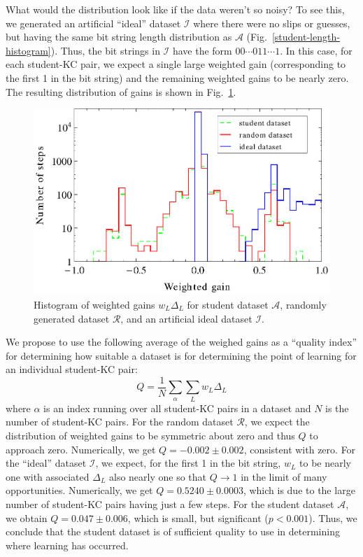 \documentclass{acmlarge-edm}
\begin{document}
What would the distribution look like if the data weren't 
so noisy?  To see this, we generated an artificial ``ideal'' dataset
$\mathcal{I}$ where there were no slips or guesses, but having
the same bit string length distribution as $\mathcal{A}$ 
(Fig.~\ref{student-length-histogram}).  Thus, the bit strings
in $\mathcal{I}$ have the form $00\cdots011\cdots1$.
In this case, for each student-KC pair, we expect a single 
large weighted gain (corresponding to the first 1 in the bit string) 
and the remaining weighted gains to be nearly zero.  The resulting 
distribution of gains is shown
in  Fig.~\ref{weighted-gain-histogram2}.

\begin{figure}
  \centering \includegraphics{weighted-gain-histogram2.eps}
   \caption{Histogram of weighted gains $w_L \Delta_L$ for
     student dataset $\mathcal{A}$, randomly generated dataset $\mathcal{R}$,
     and an artificial ideal dataset $\mathcal{I}$.}
    \label{weighted-gain-histogram2}
\end{figure}


We propose to use the following average of the weighed gains as
a ``quality index'' for determining how suitable a 
dataset is for determining the point of learning for an individual
student-KC pair:
%
\begin{equation}
           Q= \frac{1}{N} \sum_\alpha \sum_L w_L \Delta_L
\end{equation}
%
where $\alpha$ is an index running over all student-KC pairs in a 
dataset and $N$ is the number of student-KC pairs.
For the random dataset $\mathcal{R}$, we expect the distribution of 
weighted gains to be symmetric about zero and thus $Q$ to approach zero.  
Numerically, we get  $Q=-0.002\pm0.002$, consistent with zero.
For the ``ideal'' dataset $\mathcal{I}$,
we expect, for the first 1 in the bit string, $w_L$ to be nearly one 
with associated $\Delta_L$ also nearly one so that $Q\to 1$ in
the limit of many opportunities.
Numerically, we get $Q=0.5240\pm0.0003$, which is due to the 
large number of student-KC pairs having just a few steps.  
For the student dataset $\mathcal{A}$, we obtain $Q=0.047\pm0.006$, which
is small, but significant ($p<0.001$). Thus, we conclude that the
student dataset is of sufficient quality to use in determining where learning has occurred.
\end{document}

